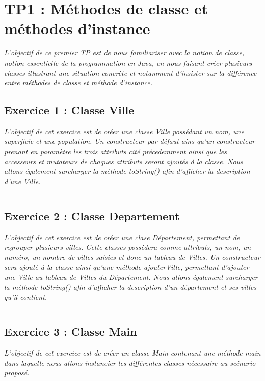 \chapter{TP1 : Méthodes de classe et méthodes d'instance}
\textit{L’objectif de ce premier TP est de nous familiariser avec la notion de classe, notion essentielle de la programmation en Java, en nous faisant créer plusieurs classes illustrant une situation concrète et notamment d’insister sur la différence entre méthodes de classe et méthode d’instance.}

\section{Exercice 1 : Classe Ville}
\textit{L'objectif de cet exercice est de créer une classe Ville possédant un nom, une superficie et une population. Un constructeur par défaut ains qu'un constructeur prenant en paramètre les trois attributs cité précedemment ainsi que les accesseurs et mutateurs de chaques attributs seront ajoutés à la classe. Nous allons également surcharger la méthode toString() afin d'afficher la description d'une Ville.}
\inputminted[linenos,firstline=5,lastline=90]{java}{../sources/src/tp1/Ville.java}

\section{Exercice 2 : Classe Departement}
\textit{L'objectif de cet exercice est de créer une clase Département, permettant de regrouper plusieurs villes. Cette classes possèdera comme attributs, un nom, un numéro, un nombre de villes saisies et donc un tableau de Villes. Un constructeur sera ajouté à la classe ainsi qu'une méthode ajouterVille, permettant d'ajouter une Ville au tableau de Villes du Département. Nous allons également surcharger la méthode toString() afin d'afficher la description d'un département et ses villes qu'il contient.}
\inputminted[linenos,firstline=3,lastline=80]{java}{../sources/src/tp1/Departement.java}

\section{Exercice 3 : Classe Main}
\textit{L'objectif de cet exercice est de créer un classe Main contenant une méthode main dans laquelle nous allons instancier les différentes classes nécessaire au scénario proposé.}
\inputminted[linenos,firstline=3,lastline=29]{java}{../sources/src/tp1/Main.java}

